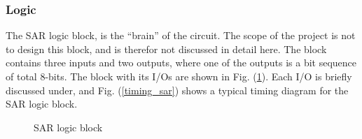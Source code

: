 \documentclass[english, 12pt, a4paper]{article}
\begin{document}
\subsubsection{Logic}
The SAR logic block, is the ``brain'' of the circuit. The scope of the project is not to design this block, and is therefor not discussed in detail here. The block contains three inputs and 
two outputs, where one of the outputs is a bit sequence of total 8-bits. The block with its I/Os are shown in Fig. (\ref{sar:logic}). Each I/O is briefly discussed under, and Fig. (\ref{timing_sar})
shows a typical timing diagram for the SAR logic block.
\begin{figure}[!ht]
 \centering
 \caption{SAR logic block}
 \label{sar:logic}
\end{figure}
\end{document}
